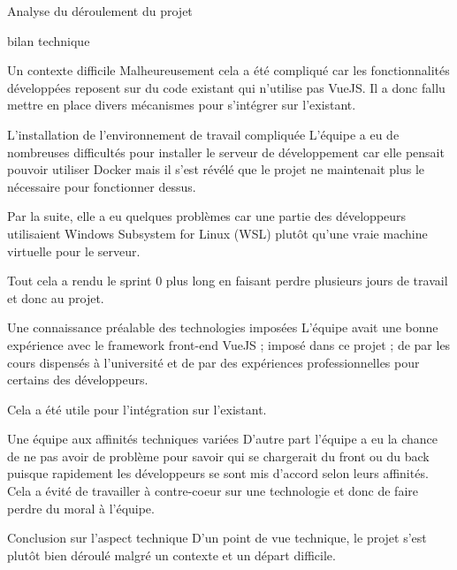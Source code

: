 \documentclass[]{article}
\begin{document}
{\begin{section}{Analyse du déroulement du projet}
\begin{subsection}{bilan technique}
\begin{subsubsection}{Un contexte difficile}
         Malheureusement cela a été compliqué car les fonctionnalités développées reposent sur du code existant qui n'utilise pas VueJS. Il a donc fallu mettre en place divers mécanismes pour s'intégrer sur l'existant.
     \end{subsubsection}

     \begin{subsubsection}{L'installation de l'environnement de travail compliquée}
         L'équipe a eu de nombreuses difficultés pour installer le serveur de développement car elle pensait pouvoir utiliser Docker mais il s'est révélé que le projet ne maintenait plus le nécessaire pour fonctionner dessus.

         Par la suite, elle a eu quelques problèmes car une partie des développeurs utilisaient Windows Subsystem for Linux (WSL) plutôt qu'une vraie machine virtuelle pour le serveur.

         Tout cela a rendu le sprint 0 plus long en faisant perdre plusieurs jours de travail et donc au projet.
     \end{subsubsection}

     \begin{subsubsection}{Une connaissance préalable des technologies imposées }
         L'équipe avait une bonne expérience avec le framework front-end VueJS ; imposé dans ce projet ; de par les cours dispensés à l'université et de par des expériences professionnelles pour certains des développeurs.

         Cela a été utile pour l'intégration sur l'existant.
     \end{subsubsection}

     \begin{subsubsection}{Une équipe aux affinités techniques variées }
         D'autre part l'équipe a eu la chance de ne pas avoir de problème pour savoir qui se chargerait du front ou du back puisque rapidement les développeurs se sont mis d'accord selon leurs affinités. Cela a évité de travailler à contre-coeur sur une technologie et donc de faire perdre du moral à l'équipe.
     \end{subsubsection}

     \begin{subsubsection}{Conclusion sur l'aspect technique}
        D'un point de vue technique, le projet s'est plutôt bien déroulé malgré un contexte et un départ difficile.
     \end{subsubsection}
 \end{subsection}


\end{section}}
\end{document}
